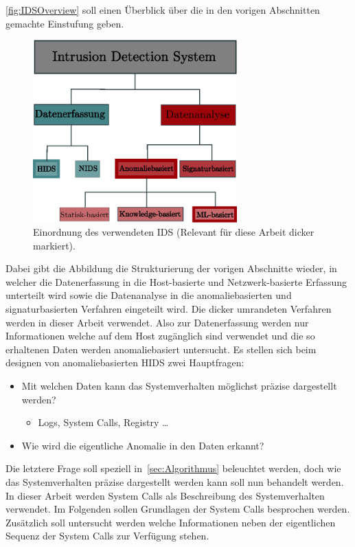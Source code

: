                 \autoref{fig:IDSOverview} soll einen Überblick über die in den vorigen Abschnitten gemachte Einstufung geben.
                \begin{figure}[ht]
                    \centering
                    \includegraphics[width=0.7\textwidth]{images/Illustrationen/IDS/IDSOverview}
                    \caption{Einordnung des verwendeten \ac{IDS} (Relevant für diese Arbeit dicker markiert).}\label{fig:IDSOverview}
                \end{figure}
                Dabei gibt die Abbildung die Strukturierung der vorigen Abschnitte wieder,
                in welcher die Datenerfassung in die Host-basierte und Netzwerk-basierte Erfassung unterteilt wird sowie die Datenanalyse
                in die anomaliebasierten und signaturbasierten Verfahren eingeteilt wird.
                Die dicker umrandeten Verfahren werden in dieser Arbeit verwendet.
                Also zur Datenerfassung werden nur Informationen welche auf dem Host zugänglich sind verwendet 
                und die so erhaltenen Daten werden anomaliebasiert untersucht.
                Es stellen sich beim designen von anomaliebasierten \ac{HIDS} zwei Hauptfragen:
                \begin{itemize}
                    \item Mit welchen Daten kann das Systemverhalten möglichst präzise dargestellt werden?
                        \begin{itemize}
                            \item Logs, System Calls, Registry \dots~\cite{HIDSSURVEY2019bridges}
                        \end{itemize}
                    \item Wie wird die eigentliche Anomalie in den Daten erkannt?
                \end{itemize}
                Die letztere Frage soll speziell in~\autoref{sec:Algorithmus} beleuchtet werden, doch wie das Systemverhalten präzise dargestellt werden kann soll nun behandelt werden.
                In dieser Arbeit werden System Calls als Beschreibung des Systemverhalten verwendet.
                Im Folgenden sollen Grundlagen der System Calls besprochen werden.
                Zusätzlich soll untersucht werden welche Informationen neben der eigentlichen Sequenz der System Calls zur Verfügung stehen.


